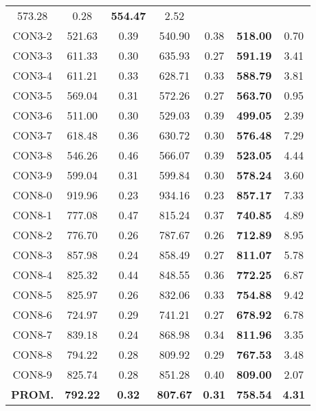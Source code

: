\begin{table}[ht]
\begin{tabular}{c c c c c c c}
573.28 & 0.28 & \bf{554.47} & 
2.52\\CON3-2 & 521.63 & 0.39 & 
540.90 & 0.38 & \bf{518.00} & 
0.70\\CON3-3 & 611.33 & 0.30 & 
635.93 & 0.27 & \bf{591.19} & 
3.41\\CON3-4 & 611.21 & 0.33 & 
628.71 & 0.33 & \bf{588.79} & 
3.81\\CON3-5 & 569.04 & 0.31 & 
572.26 & 0.27 & \bf{563.70} & 
0.95\\CON3-6 & 511.00 & 0.30 & 
529.03 & 0.39 & \bf{499.05} & 
2.39\\CON3-7 & 618.48 & 0.36 & 
630.72 & 0.30 & \bf{576.48} & 
7.29\\CON3-8 & 546.26 & 0.46 & 
566.07 & 0.39 & \bf{523.05} & 
4.44\\CON3-9 & 599.04 & 0.31 & 
599.84 & 0.30 & \bf{578.24} & 
3.60\\CON8-0 & 919.96 & 0.23 & 
934.16 & 0.23 & \bf{857.17} & 
7.33\\CON8-1 & 777.08 & 0.47 & 
815.24 & 0.37 & \bf{740.85} & 
4.89\\CON8-2 & 776.70 & 0.26 & 
787.67 & 0.26 & \bf{712.89} & 
8.95\\CON8-3 & 857.98 & 0.24 & 
858.49 & 0.27 & \bf{811.07} & 
5.78\\CON8-4 & 825.32 & 0.44 & 
848.55 & 0.36 & \bf{772.25} & 
6.87\\CON8-5 & 825.97 & 0.26 & 
832.06 & 0.33 & \bf{754.88} & 
9.42\\CON8-6 & 724.97 & 0.29 & 
741.21 & 0.27 & \bf{678.92} & 
6.78\\CON8-7 & 839.18 & 0.24 & 
868.98 & 0.34 & \bf{811.96} & 
3.35\\CON8-8 & 794.22 & 0.28 & 
809.92 & 0.29 & \bf{767.53} & 
3.48\\CON8-9 & 825.74 & 0.28 & 
851.28 & 0.40 & \bf{809.00} & 
2.07\\\bf{PROM.} & 
\bf{792.22} & \bf{0.32} & \bf{807.67} & \bf{0.31} & \bf{758.54} & \bf{4.31}\\[1ex]\hline
\end{tabular}
\label{table:nonlin}
\end{table} \clearpage
